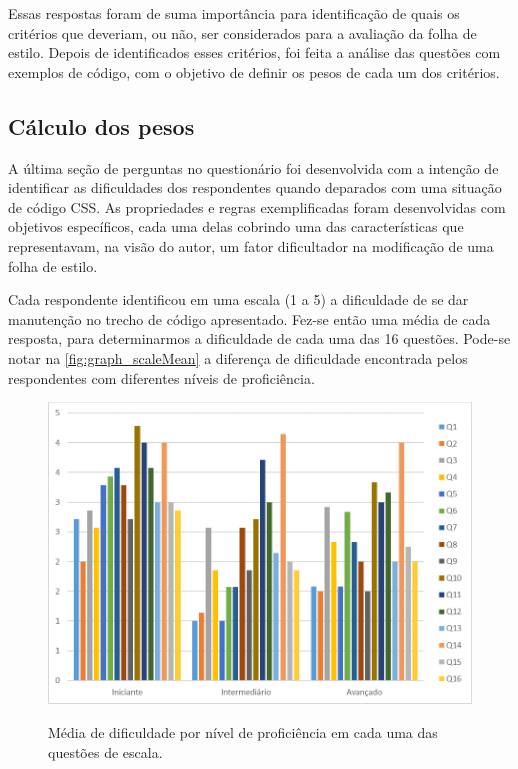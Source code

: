 

Essas respostas foram de suma importância para identificação de quais os critérios que deveriam, ou não, ser considerados para a avaliação da folha de estilo. Depois de identificados esses critérios, foi feita a análise das questões com exemplos de código, com o objetivo de definir os pesos de cada um dos critérios.

\subsection{Cálculo dos pesos}

A última seção de perguntas no questionário foi desenvolvida com a intenção de identificar as dificuldades dos respondentes quando deparados com uma situação de código CSS. As propriedades e regras exemplificadas foram desenvolvidas com objetivos específicos, cada uma delas cobrindo uma das características que representavam, na visão do autor, um fator dificultador na modificação de uma folha de estilo.

Cada respondente identificou em uma escala (1 a 5) a dificuldade de se dar manutenção no trecho de código apresentado. Fez-se então uma média de cada resposta, para determinarmos a dificuldade de cada uma das 16 questões.
Pode-se notar na \autoref{fig:graph_scaleMean} a diferença de dificuldade encontrada pelos respondentes com diferentes níveis de proficiência.

\begin{figure}[!htb]
	\centering
	\caption{Média de dificuldade por nível de proficiência em cada uma das questões de escala.}
	\includegraphics[width=1\textwidth]{./04-figuras/graph_scaleMean}
	\label{fig:graph_scaleMean}
\end{figure}

